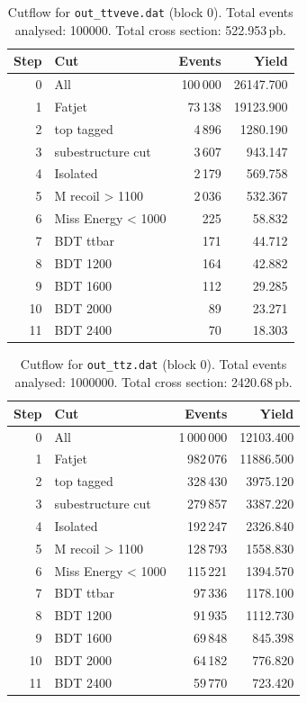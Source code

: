 \documentclass{article}
\begin{document}
\begin{table}[H]
\centering
\begin{tabular}{r l r r}
\toprule
Step & Cut & Events & Yield \\
\midrule
0 & All & 100\,000 & 26147.700 \\
1 & Fatjet & 73\,138 & 19123.900 \\
2 & top tagged & 4\,896 & 1280.190 \\
3 & subestructure cut & 3\,607 & 943.147 \\
4 & Isolated & 2\,179 & 569.758 \\
5 & M recoil > 1100 & 2\,036 & 532.367 \\
6 & Miss Energy < 1000 & 225 & 58.832 \\
7 & BDT ttbar & 171 & 44.712 \\
8 & BDT 1200 & 164 & 42.882 \\
9 & BDT 1600 & 112 & 29.285 \\
10 & BDT 2000 & 89 & 23.271 \\
11 & BDT 2400 & 70 & 18.303 \\
\bottomrule
\end{tabular}
\caption{Cutflow for \texttt{out\_ttveve.dat} (block 0). Total events analysed: 100000. Total cross section: 522.953\,pb.}
\label{tab:cutflow-out-ttveve-dat}
\end{table}

\begin{table}[H]
\centering
\begin{tabular}{r l r r}
\toprule
Step & Cut & Events & Yield \\
\midrule
0 & All & 1\,000\,000 & 12103.400 \\
1 & Fatjet & 982\,076 & 11886.500 \\
2 & top tagged & 328\,430 & 3975.120 \\
3 & subestructure cut & 279\,857 & 3387.220 \\
4 & Isolated & 192\,247 & 2326.840 \\
5 & M recoil > 1100 & 128\,793 & 1558.830 \\
6 & Miss Energy < 1000 & 115\,221 & 1394.570 \\
7 & BDT ttbar & 97\,336 & 1178.100 \\
8 & BDT 1200 & 91\,935 & 1112.730 \\
9 & BDT 1600 & 69\,848 & 845.398 \\
10 & BDT 2000 & 64\,182 & 776.820 \\
11 & BDT 2400 & 59\,770 & 723.420 \\
\bottomrule
\end{tabular}
\caption{Cutflow for \texttt{out\_ttz.dat} (block 0). Total events analysed: 1000000. Total cross section: 2420.68\,pb.}
\label{tab:cutflow-out-ttz-dat}
\end{table}
\end{document}
